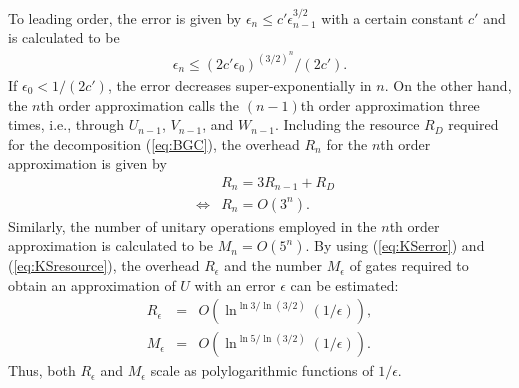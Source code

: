 To leading order, the error is given by $\epsilon _n \leq c' \epsilon _{n-1}^{3/2}$ with a certain constant $c'$ and is calculated to be 
\begin{eqnarray}
\epsilon _n \leq (2c' \epsilon _0)^{(3/2)^n}/(2c').
\label{eq:KSerror}
\end{eqnarray}
If $\epsilon _0 < 1/(2c')$, the error decreases super-exponentially in $n$.
On the other hand, the $n$th order approximation calls the $(n-1)$th order approximation three times, i.e., through $U_{n-1}$, $V_{n-1}$, and $W_{n-1}$.
Including the resource $R_D$ required for the decomposition (\ref{eq:BGC}), the overhead $R_n$ for the $n$th order approximation is given by
\begin{eqnarray}
&&R_n = 3R_{n-1} + R_D
\\
&\Leftrightarrow& R_n = O(3^n).
\label{eq:KSresource}
\end{eqnarray} 
Similarly, the number of unitary operations employed in the $n$th order approximation is calculated to be $M_n = O(5^n)$.
By using (\ref{eq:KSerror}) and (\ref{eq:KSresource}), the overhead $R_{\epsilon}$ and the number $M_{\epsilon}$ of gates required to obtain an approximation of $U$ with an error $\epsilon$ can be estimated: 
\begin{eqnarray}
R_{\epsilon} &=& O(\ln ^{\ln 3/\ln (3/2)} (1/\epsilon)),
\\
M_{\epsilon} &=& O(\ln ^{\ln 5/\ln (3/2)} (1/\epsilon)).
\end{eqnarray}
Thus, both $R_{\epsilon}$ and $M_{\epsilon}$ scale as polylogarithmic functions of $1/\epsilon$.


